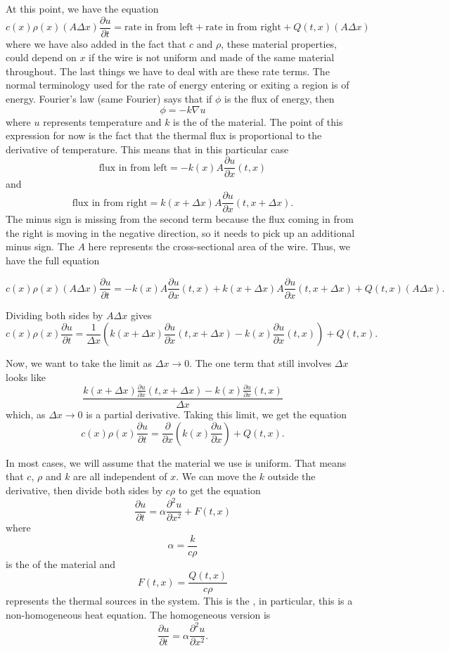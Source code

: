 \documentclass{ximera}
\begin{document}
At this point, we have the equation
\[  
    c(x)\rho(x) (A\Delta x)\frac{\partial u}{\partial t}  = \text{rate in from left} + \text{rate in from right} + Q(t,x)(A \Delta x) 
\]
where we have also added in the fact that $c$ and $\rho$, these material properties, could depend on $x$ if the wire is not uniform and made of the same material throughout. The last things we have to deal with are these rate terms. The normal terminology used for the rate of energy entering or exiting a region is \emph{} of energy. Fourier's law (same Fourier) says that if $\phi$ is the flux of energy, then 
\[ 
    \phi = -k \nabla u 
\] 
where $u$ represents temperature and $k$ is the \emph{} of the material. The point of this expression for now is the fact that the thermal flux is proportional to the derivative of temperature. This means that in this particular case
\[ 
    \text{flux in from left} = -k(x) A\frac{\partial u}{\partial x}(t, x) 
\] 
and 
\[ 
    \text{flux in from right} = k(x+\Delta x) A \frac{\partial u}{\partial x}(t, x+\Delta x). 
\] 
The minus sign is missing from the second term because the flux coming in from the right is moving in the negative direction, so it needs to pick up an additional minus sign. The $A$ here represents the cross-sectional area of the wire. Thus, we have the full equation

\[  
    c(x)\rho(x) (A\Delta x)\frac{\partial u}{\partial t}  = -k(x) A\frac{\partial u}{\partial x}(t, x) + k(x+\Delta x) A \frac{\partial u}{\partial x}(t, x+\Delta x) + Q(t,x)(A \Delta x). 
\]

Dividing both sides by $A \Delta x$ gives
\[ 
    c(x)\rho(x) \frac{\partial u}{\partial t} = \frac{1}{\Delta x}\left( k(x+\Delta x) \frac{\partial u}{\partial x}(t, x+\Delta x) - k(x) \frac{\partial u}{\partial x}(t, x) \right) + Q(t,x). 
\]

Now, we want to take the limit as $\Delta x \rightarrow 0$. The one term that still involves $\Delta x$ looks like
\[ 
    \frac{ k(x+\Delta x) \frac{\partial u}{\partial x}(t, x+\Delta x) - k(x) \frac{\partial u}{\partial x}(t, x) }{\Delta x} 
\] 
which, as $\Delta x \rightarrow 0$ is a partial derivative. Taking this limit, we get the equation
\[ 
    c(x)\rho(x) \frac{\partial u}{\partial t} = \frac{\partial}{\partial x}\left(k(x) \frac{\partial u}{\partial x}\right) + Q(t,x). 
\]

In most cases, we will assume that the material we use is uniform. That means that $c$, $\rho$ and $k$ are all independent of $x$. We can move the $k$ outside the derivative, then divide both sides by $c\rho$ to get the equation
\[ 
    \frac{\partial u}{\partial t} = \alpha \frac{\partial^2 u}{\partial x^2} + F(t,x) 
\] 
where 
\[ 
    \alpha = \frac{k}{c\rho} 
\] 
is the \emph{} of the material and 
\[ 
    F(t,x) = \frac{Q(t,x)}{c\rho} 
\] 
represents the thermal sources in the system. This is the \emph{}, in particular, this is a non-homogeneous heat equation. The homogeneous version is
\[ 
    \frac{\partial u}{\partial t} = \alpha \frac{\partial^2 u}{\partial x^2}. 
\]
\end{document}
